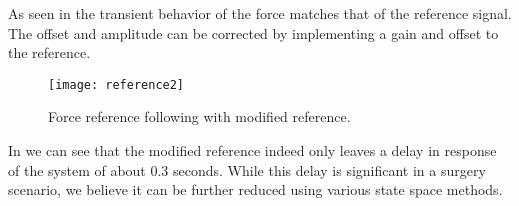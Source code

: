 As seen in  the transient behavior of the force matches that of the reference signal.
The offset and amplitude can be corrected by implementing a gain and offset to the reference.

\begin{figure}[H]
\centering
\hspace{-2.5em}\texttt{[image: reference2]}
\caption{Force reference following with modified reference.}
\label{fig:freffl2}
\end{figure}

In  we can see that the modified reference indeed only leaves a delay in response of the system of about 0.3 seconds.
While this delay is significant in a surgery scenario, we believe it can be further reduced using various state space methods.